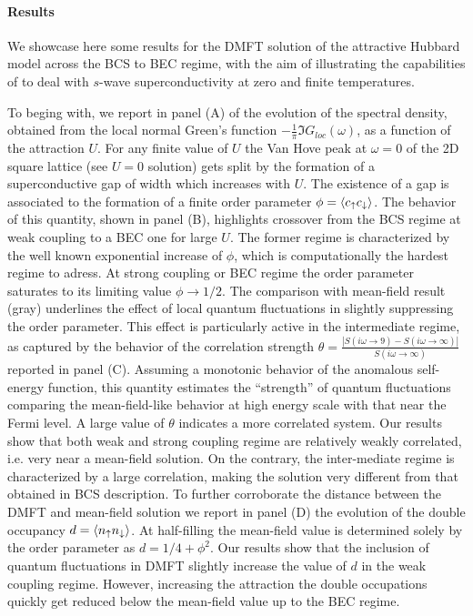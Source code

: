 \documentclass[edipack2.tex]{subfiles}
\begin{document}
\paragraph{Results}
We showcase here some results for the DMFT solution of the attractive
Hubbard model across the BCS to BEC regime, with the aim of
illustrating the capabilities of \NAME to deal with $s$-wave
superconductivity at zero and finite temperatures.

To beging with, we report in  panel (A) of  the
evolution of the spectral density, obtained from the local normal
Green's function $-\tfrac{1}{\pi}\Im{G}_{loc}(\omega)$, as a function
of the attraction $U$. For any finite value of  $U$ the Van Hove peak
at $\omega=0$ of the 2D square lattice (see $U=0$
solution) gets split by the formation of a superconductive gap of
width which increases with $U$.
The existence of a gap is associated to the formation of a finite
order parameter $\phi=\langle c_\uparrow c_\downarrow\rangle$. The behavior of
this quantity, shown in panel (B), highlights crossover from the BCS
regime at weak coupling to a BEC one for large $U$.
The former regime is characterized by the well known exponential increase of
$\phi$, which is computationally the hardest regime to adress. At
strong coupling or BEC regime the order parameter saturates to its
limiting value $\phi\to 1/2$. The comparison with mean-field result
(gray) underlines the effect of local quantum fluctuations in slightly
suppressing the order parameter. This effect is particularly active in
the intermediate regime, as captured by the behavior of the
correlation strength
$\theta=\frac{|S(i\omega\to9)-S(i\omega\to\infty)|}{S(i\omega\to\infty)}$
reported in panel (C). Assuming a monotonic behavior of the anomalous
self-energy function, this quantity estimates the ``strength'' of
quantum fluctuations comparing the mean-field-like behavior at high
energy scale with that near the Fermi level. A large value of $\theta$
indicates a more correlated system.
Our results show that both weak and strong coupling regime are
relatively weakly correlated, i.e. very near a mean-field solution. On
the contrary, the inter-mediate regime is characterized by a large
correlation, making the solution very different from that obtained in
BCS description.  
To further corroborate the distance between the DMFT and mean-field
solution we report in panel (D) the evolution of the double occupancy
$d=\langle n_\uparrow n_\downarrow\rangle$. At half-filling the mean-field value is
determined solely by the order parameter as $d=1/4 + \phi^2$.
Our results show that the inclusion of quantum fluctuations in DMFT
slightly increase the value of $d$ in the weak coupling
regime. However, increasing the attraction the double occupations
quickly get reduced below the mean-field value up to the BEC regime.
\end{document}
